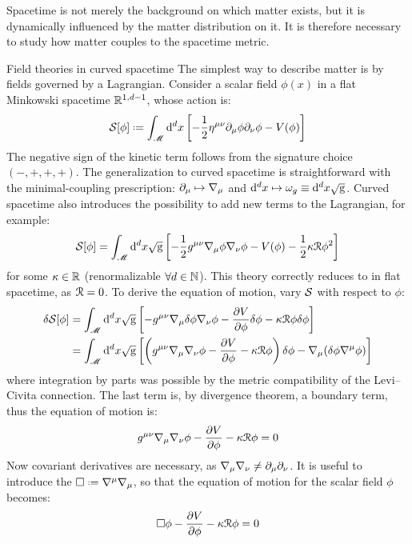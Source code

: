 Spacetime is not merely the background on which matter exists, but it is dynamically influenced by the matter distribution on it. It is therefore necessary to study how matter couples to the spacetime metric.

\begin{observation}{Field theories in curved spacetime}{}
  The simplest way to describe matter is by fields governed by a Lagrangian. Consider a scalar field $ \phi(x) $ in a flat Minkowski spacetime $ \mathbb{R}^{1,d-1} $, whose action is:
  \begin{equation}
    \act[\phi] \defeq \int_\man \dd^d x \left[ - \frac{1}{2} \eta^{\mu \nu} \pa_\mu \phi \pa_\nu \phi - V(\phi) \right]
  \label{eq:scalar-action}
  \end{equation}
  The negative sign of the kinetic term follows from the signature choice $ (-,+,+,+) $. The generalization to curved spacetime is straightforward with the minimal-coupling prescription: $ \partial_\mu \mapsto \nabla_\mu $ and $ \mathrm{d}^d x \mapsto \omega_g \equiv \mathrm{d}^d x \sqrt{\mathrm{g}} $. Curved spacetime also introduces the possibility to add new terms to the Lagrangian, for example:
  \begin{equation}
    \mathcal{S}[\phi] = \int_\mathscr{M} \mathrm{d}^d x \sqrt{\mathrm{g}} \left[ - \frac{1}{2} g^{\mu \nu} \nabla_\mu \phi \nabla_\nu \phi - V(\phi) - \frac{1}{2} \kappa \EuScript{R} \phi^2 \right]
    \label{eq:scalar-action-r}
  \end{equation}
  for some $ \kappa \in \mathbb{R} $ (renormalizable $ \forall d \in \mathbb{N} $). This theory correctly reduces to  in flat spacetime, as $ \EuScript{R} = 0 $. To derive the equation of motion, vary $ \mathcal{S} $ with respect to $ \phi $:
  \begin{equation*}
    \begin{split}
      \delta \mathcal{S}[\phi]
      &= \int_\mathscr{M} \mathrm{d}^d x \sqrt{\mathrm{g}} \left[ - g^{\mu \nu} \nabla_\mu \delta \phi \nabla_\nu \phi - \frac{\partial V}{\partial \phi} \delta \phi - \kappa \EuScript{R} \phi \delta \phi \right] \\
      &= \int_\mathscr{M} \mathrm{d}^d x \sqrt{\mathrm{g}} \left[ \left( g^{\mu \nu} \nabla_\mu \nabla_\nu \phi - \frac{\partial V}{\partial \phi} - \kappa \EuScript{R} \phi \right) \delta \phi - \nabla_\mu ( \delta \phi \nabla^\mu \phi ) \right]
    \end{split}
  \end{equation*}
  where integration by parts was possible by the metric compatibility of the Levi--Civita connection. The last term is, by divergence theorem, a boundary term, thus the equation of motion is:
  \begin{equation*}
    g^{\mu \nu} \nabla_\mu \nabla_\nu \phi - \frac{\partial V}{\partial \phi} - \kappa \EuScript{R} \phi = 0
  \end{equation*}
  Now covariant derivatives are necessary, as $ \nabla_\mu \nabla_\nu \neq \partial_\mu \partial_\nu $. It is useful to introduce the  $ \Box \defeq \na^\mu \na_\mu $, so that the equation of motion for the scalar field $ \phi $ becomes:
  \begin{equation}
    \Box \phi - \frac{\partial V}{\partial \phi} - \kappa \EuScript{R} \phi = 0
  \end{equation}
\end{observation}

